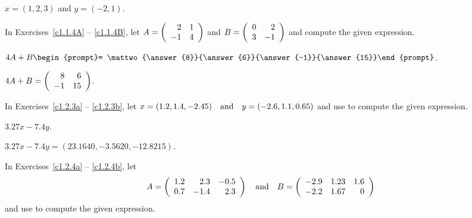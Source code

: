 \documentclass{ximera}
\begin{document}
\begin{exercise}\label{c1.1.3c}
  $x=(1,2,3)$ and $y=(-2,1)$.


%
\end{exercise}





\problemlabel

\noindent In Exercises~\ref{c1.1.4A} -- \ref{c1.1.4B}, let
$A=\left(\begin{array}{rr} 2 & 1\\ -1 &4\end{array}\right)$ and $B=\left(\begin{array}{rr} 0 & 2\\ 3 &-1\end{array}\right)$ and compute the given 
expression.


\begin{exercise}\label{c1.1.4A}
  $4A+B\begin{prompt}= \mattwo{\answer{8}}{\answer{6}}{\answer{-1}}{\answer{15}}\end{prompt}$.

\begin{solution}
\ans $4A + B = \left(\begin{array}{rr} 8 & 6\\ -1 &15\end{array}\right)$.


\end{solution}
\end{exercise}





\matlabproblemlabel

\noindent In Exercises~\ref{c1.2.3a} -- \ref{c1.2.3b}, let 
$x=(1.2,1.4,-2.45) \quad\mbox{and}\quad y=(-2.6,1.1,0.65)$ and use \Matlab to compute the 
given expression.


\begin{computerExercise}  \label{c1.2.3a}
$3.27x-7.4y$.

\begin{solution}
\ans $3.27x - 7.4y = (23.1640, -3.5620, -12.8215)$.

\end{solution}
\end{computerExercise}





\matlabproblemlabel

\noindent In Exercises~\ref{c1.2.4a} -- \ref{c1.2.4b}, let 
\[
A = \left(\begin{array}{rrr} 1.2 & 2.3 & -0.5\\ 0.7 & -1.4 & 2.3
\end{array}\right) \quad\mbox{and}\quad
B = \left(\begin{array}{rrr} -2.9 & 1.23 & 1.6\\ -2.2 & 1.67 & 0
\end{array}\right)
\]
and use \Matlab to compute the given expression.
\end{document}
